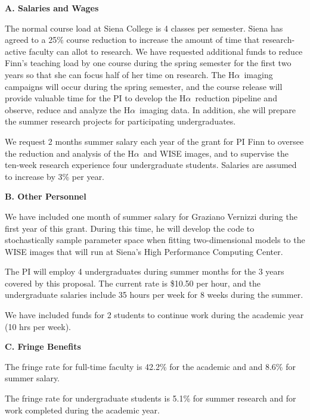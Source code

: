 \documentclass[preprint,11pt]{aastex}
\newcommand{\ha}{H$\alpha$}
\begin{document}
\begin{center}
{\bf \large A. Salaries and Wages}
\end{center}

The normal course load at Siena College is 4 classes per semester.  Siena
has agreed to a 25\% course reduction to increase the amount of time
that research-active faculty can allot to research.  We have requested additional funds to reduce
Finn's teaching load by one course during the spring semester for the
first two years so that she can
focus half of her time on research.  The \ha \ imaging campaigns will
occur during the spring semester, and the course release will provide valuable time
for the PI to develop the \ha \ reduction pipeline and observe, reduce and analyze
the \ha \ imaging data.  In addition, she will prepare the summer research
projects for participating undergraduates.  

We request 2 months summer salary each year of the grant for PI Finn
to oversee the reduction and analysis of the \ha \ and WISE images,
and to supervise the ten-week research experience four undergraduate students.  
Salaries are assumed to increase by 3\% per year.

\begin{center}
{\bf \large B. Other Personnel}
\end{center}

We have included one month of summer salary for Graziano Vernizzi
during the first year of this grant.  During this time, he will
develop the code to stochastically sample parameter space when fitting
two-dimensional models to the WISE images that will run at Siena's
High Performance Computing Center.

The PI will employ 4 undergraduates during summer months
for the 3 years covered by this proposal.  The current rate is \$10.50
per hour, and the undergraduate salaries include 35 hours per week 
for 8 weeks during the summer.  


We have included funds for 2 students to continue work during the
academic year (10 hrs per week).

\begin{center}
{\bf \large C. Fringe Benefits}
\end{center}

The fringe rate for full-time faculty 
is 42.2\% for the academic and and 8.6\% for summer salary.

The fringe rate for undergraduate students is 
5.1\% for summer research and for work completed during the
academic year.
\end{document}
